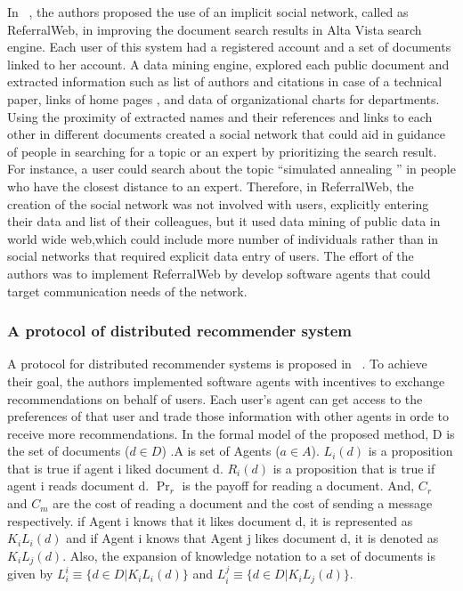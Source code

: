 \documentclass [12pt]{article} \usepackage{multicol}
\begin{document}
		In ~\cite{kautz1997referral}, the authors proposed the use of an
implicit social network, called as ReferralWeb, in improving the document search results in
Alta Vista search engine. Each user of this system had a registered account and a set of documents linked
to her account. A data mining engine, explored each public document
and extracted information such as list of authors and citations in
case of a technical paper, links of home pages , and data of
organizational charts for departments. Using the proximity of
extracted names and their references and links to each other in
different documents created a social network that could aid in
guidance of people in searching for a topic or an expert by
prioritizing the search result. For instance, a user could search
about the topic ``simulated annealing '' in people who have the closest distance to an expert. Therefore,
in ReferralWeb, the creation of the social network was not involved
with users,  explicitly entering their data and list of their
colleagues, but it used data mining of public data in world wide
web,which could include more number of individuals rather than in
social networks that required explicit data entry of users. The
effort of the authors was to implement ReferralWeb by develop
software agents that could target communication needs of the network. 

\paragraph{}

\subsubsection{A protocol of distributed recommender system}


A protocol for distributed recommender systems is proposed in
~\cite{vidal2005protocol}. To achieve their  goal, the authors implemented
software agents with incentives to exchange recommendations on behalf
of users. Each user's agent can get access to the preferences
of that user and trade those information with other agents in
orde to receive more recommendations.
\newline In the formal model of the proposed method, D is the set of documents ($ d \in D $)
.A is set of Agents ($ a \in A $). $L_i (d) $ is a proposition that is
true if  agent i liked document d. $R_i (d) $ is a proposition that is true if agent i reads
document d. $\Pr_r $ is the payoff for reading a document. And, $C_r$ and
$C_m$ are the cost of reading a document and the cost of sending a message
respectively. \newline if Agent i knows that it likes document d, it
is represented as $ K_iL_i(d)$ and if Agent i knows that Agent j likes
document d, it is denoted as $K_iL_j(d)$. Also, the expansion of
knowledge notation to a set of documents is given by $L_i^i \equiv \{
d \in D |  K_iL_i(d)\}$ and  $L_i^j \equiv \{ d \in D | K_iL_j(d)\}$.
\end{document}

